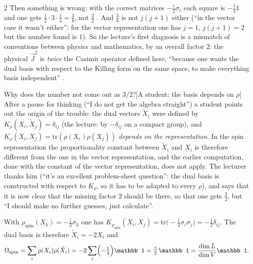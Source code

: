 \begin{paracol}{2}
Then something is wrong: with the correct matrices $-\frac{\mathrm i}2\sigma_i$ each square is $-\frac14\mathbb 1$ and one gets $\frac12\cdot3\cdot\frac14=\frac38$, not $\frac32$   . And $\frac38$ is not $j(j+1)$ either (``in the vector case it wasn't either'': for the vector representation one has $j=1$, $j(j+1)=2$ but the number found is $1$). So the lecture's first diagnosis is a mismatch of conventions between physics and mathematics, by an overall factor $2$: the physical $\vec J^2$ is \emph{twice} the Casimir operator defined here, ``because one wants the dual basis with respect to the Killing form on the same space, to make everything basis independent''       .
\begin{answer}{Why does the number not come out as $3/2$?}[A student: the basis depends on $\rho$]
After a pause for thinking (``I do not get the algebra straight'') a student points out the origin of the trouble: the dual vectors $\tilde X_i$ were defined by $K_\rho(X_i,\tilde X_j)=\delta_{ij}$ (the lecture: by $-\delta_{ij}$ on a compact group), and $K_\rho(X_i,X_j)=\mathrm{tr}(\rho(X_i)\rho(X_j))$ \emph{depends on the representation}. In the spin representation the proportionality constant between $\tilde X_i$ and $X_i$ is therefore different from the one in the vector representation, and the earlier computation, done with the constant of the vector representation, does not apply. The lecturer thanks him (``it's an excellent problem-sheet question'': the dual basis is constructed with respect to $K_\rho$, so it has to be adapted to every $\rho$), and says that it is now clear that the missing factor $2$ should be there, so that one gets $\frac32$, but ``I should make no further guesses, just calculate''.       
\end{answer}
\begin{coursenote}
With $\rho_{\mathrm{spin}}(X_k)=-\frac{\mathrm i}{2}\sigma_k$ one has $K_{\rho_{\mathrm{spin}}}(X_i,X_j)=\mathrm{tr}\bigl(-\tfrac14\sigma_i\sigma_j\bigr)=-\tfrac12\delta_{ij}$. The dual basis is therefore $\tilde X_i=-2X_i$ and
\[
  \Omega_{\mathrm{spin}}=\sum_i\rho(X_i)\rho(\tilde X_i)=-2\sum_i\Bigl(-\tfrac14\Bigr)\mathbb 1=\tfrac32\,\mathbb 1=\frac{\dim L}{\dim V}\mathbb 1 .
\]
\end{coursenote}
\end{paracol}
